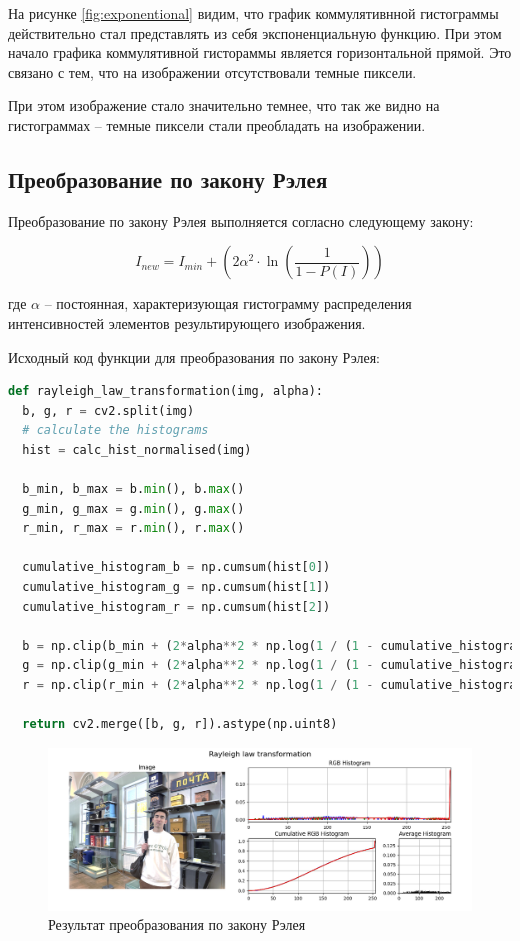 На рисунке \ref{fig:exponentional} видим, что график коммулятивнной гистограммы действительно стал представлять из себя экспоненциальную функцию. 
При этом начало графика коммулятивной гистораммы является горизонтальной прямой. Это связано с тем, что на изображении отсутствовали темные пиксели. 

При этом изображение стало значительно темнее, что так же видно на гистограммах -- темные пиксели стали преобладать на изображении.


\subsection{Преобразование по закону Рэлея}  

Преобразование по закону Рэлея выполняется согласно следующему закону:

\begin{equation}
  I_{new} = I_{min} + \left(2\alpha^2 \cdot \ln\left(\frac{1}{1 - P(I)}\right)\right)
\end{equation}

где $\alpha$ -- постоянная, характеризующая гистограмму распределения интенсивностей элементов результирующего изображения. 

Исходный код функции для преобразования по закону Рэлея:

\begin{lstlisting}[language=Python]
def rayleigh_law_transformation(img, alpha):
  b, g, r = cv2.split(img)
  # calculate the histograms
  hist = calc_hist_normalised(img)

  b_min, b_max = b.min(), b.max()
  g_min, g_max = g.min(), g.max()
  r_min, r_max = r.min(), r.max()

  cumulative_histogram_b = np.cumsum(hist[0]) 
  cumulative_histogram_g = np.cumsum(hist[1])
  cumulative_histogram_r = np.cumsum(hist[2])

  b = np.clip(b_min + (2*alpha**2 * np.log(1 / (1 - cumulative_histogram_b[b]))) ** 0.5 * 255, 0, 255)
  g = np.clip(g_min + (2*alpha**2 * np.log(1 / (1 - cumulative_histogram_g[g]))) ** 0.5 * 255, 0, 255)
  r = np.clip(r_min + (2*alpha**2 * np.log(1 / (1 - cumulative_histogram_r[r]))) ** 0.5 * 255, 0, 255)
  
  return cv2.merge([b, g, r]).astype(np.uint8)
\end{lstlisting}

\begin{figure}[H]
    \centering
    \includegraphics[width=\textwidth]{../results/Rayleigh law transformation.png}
    \caption{Результат преобразования по закону Рэлея}
    \label{fig:rayleigh}
\end{figure}


